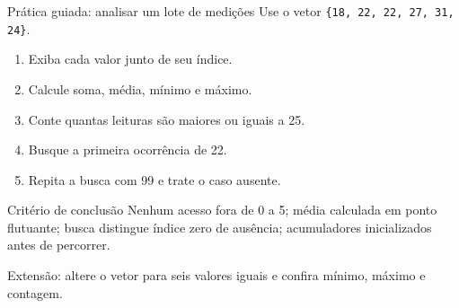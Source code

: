 \begin{frame}{Prática guiada: analisar um lote de medições}
Use o vetor \texttt{\{18, 22, 22, 27, 31, 24\}}.
\begin{enumerate}
\item Exiba cada valor junto de seu índice.
\item Calcule soma, média, mínimo e máximo.
\item Conte quantas leituras são maiores ou iguais a 25.
\item Busque a primeira ocorrência de 22.
\item Repita a busca com 99 e trate o caso ausente.
\end{enumerate}
\begin{block}{Critério de conclusão}
Nenhum acesso fora de 0 a 5; média calculada em ponto flutuante; busca distingue índice zero de ausência; acumuladores inicializados antes de percorrer.
\end{block}
\small Extensão: altere o vetor para seis valores iguais e confira mínimo, máximo e contagem.
\end{frame}
